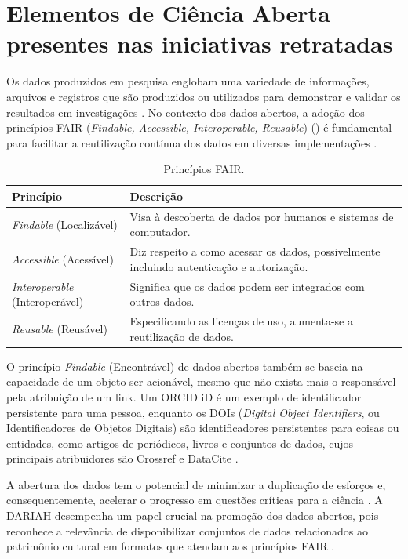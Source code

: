 \documentclass[portuguese]{textolivre}
\begin{document}
\section{Elementos de Ciência Aberta presentes nas iniciativas retratadas}\label{sec-organizacao}
Os dados produzidos em pesquisa englobam uma variedade de informações, arquivos e registros que são produzidos ou utilizados para demonstrar e validar os resultados em investigações \cite{comissaoeuropeia2017}. No contexto dos dados abertos, a adoção dos princípios FAIR (\textit{Findable, Accessible, Interoperable, Reusable}) () é fundamental para facilitar a reutilização contínua dos dados em diversas implementações \cite{wilkinson2016}.

\begin{table}[h!]
\centering
\begin{threeparttable}
\caption{Princípios FAIR.}
\label{tab01}
\begin{tabular}{>{\raggedright\arraybackslash}p{3cm} >{\raggedright\arraybackslash}p{11cm}}
\toprule
Princípio & Descrição \\
\midrule
\textit{Findable} (Localizável) &  Visa à descoberta de dados por humanos e sistemas de computador.  \\
\textit{Accessible} (Acessível) & Diz respeito a como acessar os dados, possivelmente incluindo autenticação e autorização. \\
\textit{Interoperable} (Interoperável) & Significa que os dados podem ser integrados com outros dados. \\
\textit{Reusable} (Reusável) & Especificando as licenças de uso, aumenta-se a reutilização de dados. \\
\bottomrule
\end{tabular}
\end{threeparttable}
\end{table}


O princípio \textit{Findable} (Encontrável) de dados abertos também se baseia na capacidade de um objeto ser acionável, mesmo que não exista mais o responsável pela atribuição de um link. Um ORCID iD é um exemplo de identificador persistente para uma pessoa, enquanto os DOIs (\textit{Digital Object Identifiers}, ou Identificadores de Objetos Digitais) são identificadores persistentes para coisas ou entidades, como artigos de periódicos, livros e conjuntos de dados, cujos principais atribuidores são Crossref e DataCite \cite{orcid2023}.

A abertura dos dados tem o potencial de minimizar a duplicação de esforços e, consequentemente, acelerar o progresso em questões críticas para a ciência \cite{clark2021}. A DARIAH desempenha um papel crucial na promoção dos dados abertos, pois reconhece a relevância de disponibilizar conjuntos de dados relacionados ao patrimônio cultural em formatos que atendam aos princípios FAIR \cite{tasovac2020}.
\end{document}

